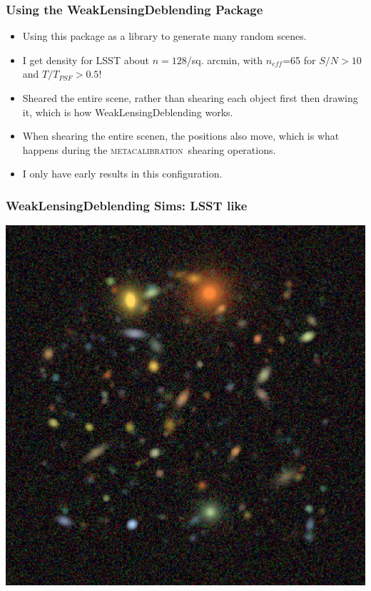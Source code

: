 \documentclass{beamer}
\newcommand{\mcal}{\textsc{metacalibration}}
\newcommand{\neff}{$n_{eff}$}
\begin{document}
\frame
{
    \frametitle{Using the WeakLensingDeblending Package}

 
    \begin{itemize}

        \item Using this package as a library to generate many random
            scenes.
            
        \item I get density for LSST about $n=128$/sq. arcmin, with
            {\color{brightred} \neff=65} for $S/N > 10$ and $T/T_{PSF} > 0.5$!

        \item Sheared the entire scene, rather than shearing each object
            first then drawing it, which is how WeakLensingDeblending
            works.
            
        \item When shearing the entire scenen, the positions also move, which
            is what happens during the \mcal\ shearing operations.

        \item I only have early results in this configuration.

    \end{itemize}

}


\begin{frame}
    \frametitle{WeakLensingDeblending Sims: LSST like}
 
    \begin{center}
        \includegraphics[height=0.8\textheight]{descwl-example1.png}
    \end{center}

\end{frame}
\end{document}
